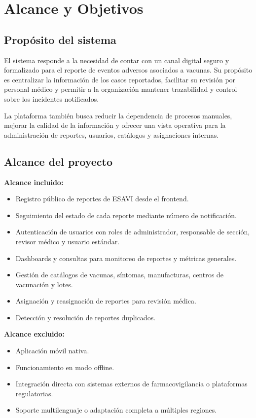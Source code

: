 \documentclass[12pt,letterpaper]{article}
\begin{document}
\section{Alcance y Objetivos}

\subsection{Propósito del sistema}

El sistema responde a la necesidad de contar con un canal digital seguro y formalizado para el reporte de eventos adversos asociados a vacunas. Su propósito es centralizar la información de los casos reportados, facilitar su revisión por personal médico y permitir a la organización mantener trazabilidad y control sobre los incidentes notificados.

La plataforma también busca reducir la dependencia de procesos manuales, mejorar la calidad de la información y ofrecer una vista operativa para la administración de reportes, usuarios, catálogos y asignaciones internas.

\subsection{Alcance del proyecto}

\textbf{Alcance incluido:}
\begin{itemize}
\item Registro público de reportes de ESAVI desde el frontend.
\item Seguimiento del estado de cada reporte mediante número de notificación.
\item Autenticación de usuarios con roles de administrador, responsable de sección, revisor médico y usuario estándar.
\item Dashboards y consultas para monitoreo de reportes y métricas generales.
\item Gestión de catálogos de vacunas, síntomas, manufacturas, centros de vacunación y lotes.
\item Asignación y reasignación de reportes para revisión médica.
\item Detección y resolución de reportes duplicados.
\end{itemize}

\textbf{Alcance excluido:}
\begin{itemize}
\item Aplicación móvil nativa.
\item Funcionamiento en modo offline.
\item Integración directa con sistemas externos de farmacovigilancia o plataformas regulatorias.
\item Soporte multilenguaje o adaptación completa a múltiples regiones.
\end{itemize}
\end{document}
